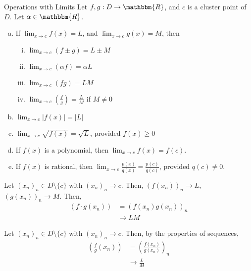 \documentclass[10pt]{extarticle}
\newcommand{\R}{\mathbbm{R}}
\begin{document}
  \begin{problem}{Operations with Limits}
    Let $f,g: D\rightarrow \R$, and $c$ is a cluster point of $D$. Let $\alpha\in\R$.
    \begin{enumerate}[(a)]
      \item If $\lim_{x\rightarrow c}f(x) = L$, and $\lim_{x\rightarrow c}g(x) = M$, then
        \begin{enumerate}[(i)]
          \item $\lim_{x\rightarrow c}(f\pm g) = L\pm M$
          \item $\lim_{x\rightarrow c}(\alpha f) = \alpha L$
          \item $\lim_{x\rightarrow c}(fg) = LM$
          \item $\lim_{x\rightarrow c}\left(\frac{f}{g}\right) = \frac{L}{M}$ if $M\neq 0$
        \end{enumerate}
      \item $\lim_{x\rightarrow c}|f(x)| = |L|$
      \item $\lim_{x\rightarrow c}\sqrt{f(x)} = \sqrt{L}$, provided $f(x) \geq 0$
      \item If $f(x)$ is a polynomial, then $\lim_{x\rightarrow c}f(x) = f(c)$.
      \item If $f(x)$ is rational, then $\lim_{x\rightarrow c}\frac{p(x)}{q(x)} = \frac{p(c)}{q(c)}$, provided $q(c)\neq 0$.
    \end{enumerate}
    \tcblower
    \begin{description}[font=\normalfont]
      \item[Proof of (a)(iii):] Let $(x_n)_n \in D\setminus \{c\}$ with $(x_n)_n \rightarrow c$. Then, $\left(f(x_n)\right)_n \rightarrow L$, $\left(g(x_n)\right)_n \rightarrow M$. Then,
        \begin{align*}
          \left(f\cdot g(x_n)\right) &= \left(f(x_n)g(x_n)\right)_n\\
                                     &\rightarrow LM \tag*{by sequence properties}
        \end{align*}
      \item[Proof of (a)(iv):] Let $(x_n)_n \in D\setminus \{c\}$ with $(x_n)_n \rightarrow c$. Then, by the properties of sequences,
        \begin{align*}
          \left(\frac{f}{g}(x_n)\right) &= \left(\frac{f(x_n)}{g(x_n)}\right)_n\\
                                        &\rightarrow \frac{L}{M} \tag*{provided $M \neq 0$}
        \end{align*}

\end{description}
\end{problem}
\end{document}

